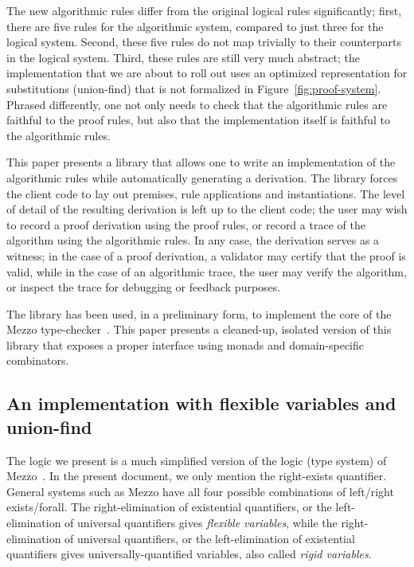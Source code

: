 \documentclass{easychair}
\newcommand{\fref}[1]{Figure~\ref{fig:#1}}
\begin{document}
The new algorithmic rules differ from the original logical rules significantly;
first, there are five rules for the algorithmic system, compared to just three
for the logical system. Second, these five rules do not map trivially to their
counterparts in the logical system. Third, these rules are still very much
abstract; the implementation that we are about to roll out uses an
optimized representation for substitutions (union-find) that is not formalized
in \fref{proof-system}. Phrased differently, one not only needs to check that
the algorithmic rules are faithful to the proof rules, but also that the
implementation itself is faithful to the algorithmic rules.

This paper presents a library that allows one to write an implementation of the
algorithmic rules while automatically generating a derivation. The library
forces the client code to lay out premises, rule applications and
instantiations. The level of detail of the resulting derivation is left up to
the client code; the user may wish to record a proof derivation using the proof
rules, or record a trace of the algorithm using the algorithmic rules.  In any
case, the derivation serves as a witness; in the case of a proof derivation, a
validator may certify that the proof is valid, while in the case of an
algorithmic trace, the user may verify the algorithm, or inspect the trace for
debugging or feedback purposes.

The library has been used, in a preliminary form, to implement the core of the
Mezzo type-checker~\cite{protzenko-phd-14}. This paper presents a cleaned-up,
isolated version of this library that exposes a proper interface using monads
and domain-specific combinators.

\subsection{An implementation with flexible variables and union-find}

The logic we present is a much simplified version of the logic (type system) of
Mezzo~\cite{pottier-protzenko-13}. In the present document, we only mention the
right-exists quantifier. General systems such as Mezzo have all four possible
combinations of left/right exists/forall.
%
The right-elimination of existential quantifiers, or the left-elimination of
universal quantifiers gives \emph{flexible variables}, while the
right-elimination of universal quantifiers, or the left-elimination of
existential quantifiers gives universally-quantified variables, also called
\emph{rigid variables}.
\end{document}
